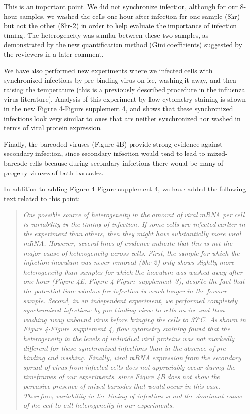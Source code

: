 \documentclass[11pt, oneside]{article}   	%
\begin{document}
{\color{black}
This is an important point.
We did not synchronize infection, although for our 8-hour samples, we washed the cells one hour after infection for one sample (8hr) but not the other (8hr-2) in order to help evaluate the importance of infection timing.
The heterogeneity was similar between these two samples, as demonstrated by the new quantification method (Gini coefficients) suggested by the reviewers in a later comment.

We have also performed new experiments where we infected cells with synchronized infections by pre-binding virus on ice, washing it away, and then raising the temperature (this is a previously described procedure in the influenza virus literature).
Analysis of this experiment by flow cytometry staining is shown in the new Figure 4-Figure supplement 4, and shows that these synchronized infections look very similar to ones that are neither synchronized nor washed in terms of viral protein expression.

Finally, the barcoded viruses (Figure 4B) provide strong evidence against secondary infection, since secondary infection would tend to lead to mixed-barcode cells because during secondary infections there would be many of progeny viruses of both barcodes.

In addition to adding Figure 4-Figure supplement 4, we have added the following text related to this point:

\begin{quote}
\textsl{
One possible source of heterogeneity in the amount of viral mRNA per cell is variability in the timing of infection.
If some cells are infected earlier in the experiment than others, then they might have substantially more viral mRNA.
However, several lines of evidence indicate that this is not the major cause of heterogeneity across cells.
First, the sample for which the infection inoculum was never removed (8hr-2) only shows slightly more heterogeneity than samples for which the inoculum was washed away after one hour (Figure 4E, Figure 4-Figure~supplement~3), despite the fact that the potential time window for infection is much longer in the former sample.
Second, in an independent experiment, we performed completely synchronized infections by pre-binding virus to cells on ice and then washing away unbound virus before bringing the cells to 37$^{\circ}$C.
As shown in Figure 4-Figure~supplement 4, flow cytometry staining found that the heterogeneity in the levels of individual viral proteins was not markedly different for these synchronized infections than in the absence of pre-binding and washing.
Finally, viral mRNA expression from the secondary spread of virus from infected cells does not appreciably occur during the timeframes of our experiments, since Figure 4B does not show the pervasive presence of mixed barcodes that would occur in this case.
Therefore, variability in the timing of infection is not the dominant cause of the cell-to-cell heterogeneity in our experiments.
}
\end{quote}
}
\end{document}
